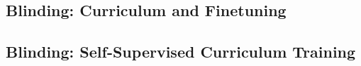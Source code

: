 %



\subsection{Blinding: Curriculum and Finetuning}

\subsection{Blinding: Self-Supervised Curriculum Training}


